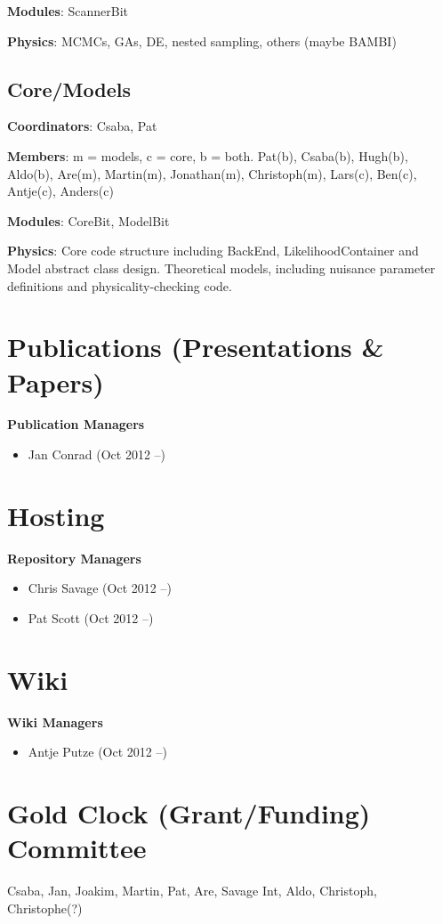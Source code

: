 \textbf{Modules}: ScannerBit

\textbf{Physics}: MCMCs, GAs, DE, nested sampling, others (maybe BAMBI)


\subsection{Core/Models}

\textbf{Coordinators}: Csaba, Pat

\textbf{Members}: m = models, c = core, b = both.  Pat(b), Csaba(b), Hugh(b), Aldo(b), Are(m), Martin(m), Jonathan(m), Christoph(m), Lars(c), Ben(c), Antje(c), Anders(c)

\textbf{Modules}: CoreBit, ModelBit

\textbf{Physics}: Core code structure including BackEnd, LikelihoodContainer and Model abstract class design. Theoretical models, including nuisance parameter definitions and physicality-checking code.


\section{Publications (Presentations \& Papers)}

\textbf{Publication Managers}
\begin{itemize}
\item Jan Conrad (Oct 2012 --)
\end{itemize}

\section{Hosting}

\textbf{Repository Managers}
\begin{itemize}
\item Chris Savage (Oct 2012 --)
\item Pat Scott (Oct 2012 --)
\end{itemize}

\section{Wiki}

\textbf{Wiki Managers}
\begin{itemize}
\item Antje Putze (Oct 2012 --)
\end{itemize}

\section{Gold Clock (Grant/Funding) Committee}
Csaba, Jan, Joakim, Martin, Pat, Are, Savage Int, Aldo, Christoph, Christophe(?)


